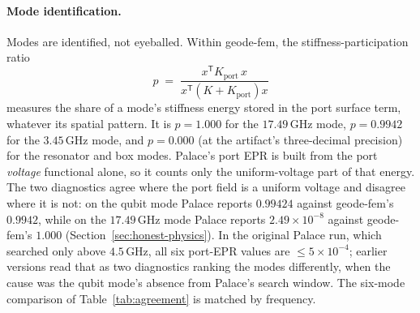 \documentclass{anvil-paper}
\begin{document}
\paragraph{Mode identification.}
Modes are identified, not eyeballed. Within geode-fem, the
stiffness-participation ratio
\begin{equation}
  p \;=\; \frac{x^{\mathsf{T}} K_{\mathrm{port}}\, x}
               {x^{\mathsf{T}} \left(K + K_{\mathrm{port}}\right) x}
  \label{eq:participation}
\end{equation}
measures the share of a mode's stiffness energy stored in the port
surface term, whatever its spatial pattern. It is $p = 1.000$ for the
$17.49$\,GHz mode, $p = 0.9942$ for the $3.45$\,GHz mode, and $p = 0.000$
(at the artifact's three-decimal precision) for the resonator and box
modes. Palace's port EPR is built from the port \emph{voltage}
functional alone, so it counts only the uniform-voltage part of that
energy. The two diagnostics agree where the port field is a uniform
voltage and disagree where it is not: on the qubit mode Palace reports
$0.99424$ against geode-fem's $0.9942$, while on the $17.49$\,GHz mode
Palace reports $2.49\times10^{-8}$ against geode-fem's $1.000$
(Section~\ref{sec:honest-physics}). In the original Palace run, which
searched only above $4.5$\,GHz, all six port-EPR values are
$\leq 5\times10^{-4}$; earlier versions read that as two diagnostics
ranking the modes differently, when the cause was the qubit mode's
absence from Palace's search window. The six-mode comparison of
Table~\ref{tab:agreement} is matched by frequency.
\end{document}

